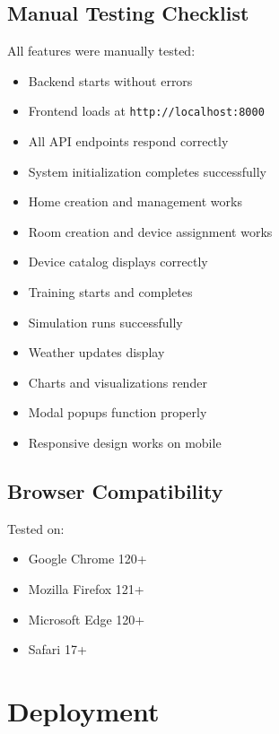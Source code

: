 \documentclass[12pt,a4paper]{article}
\begin{document}
\subsection{Manual Testing Checklist}

All features were manually tested:

\begin{itemize}[leftmargin=*]
    \item[$\boxtimes$] Backend starts without errors
    \item[$\boxtimes$] Frontend loads at \texttt{http://localhost:8000}
    \item[$\boxtimes$] All API endpoints respond correctly
    \item[$\boxtimes$] System initialization completes successfully
    \item[$\boxtimes$] Home creation and management works
    \item[$\boxtimes$] Room creation and device assignment works
    \item[$\boxtimes$] Device catalog displays correctly
    \item[$\boxtimes$] Training starts and completes
    \item[$\boxtimes$] Simulation runs successfully
    \item[$\boxtimes$] Weather updates display
    \item[$\boxtimes$] Charts and visualizations render
    \item[$\boxtimes$] Modal popups function properly
    \item[$\boxtimes$] Responsive design works on mobile
\end{itemize}

\subsection{Browser Compatibility}

Tested on:
\begin{itemize}[leftmargin=*]
    \item Google Chrome 120+
    \item Mozilla Firefox 121+
    \item Microsoft Edge 120+
    \item Safari 17+
\end{itemize}

\section{Deployment}
\end{document}
